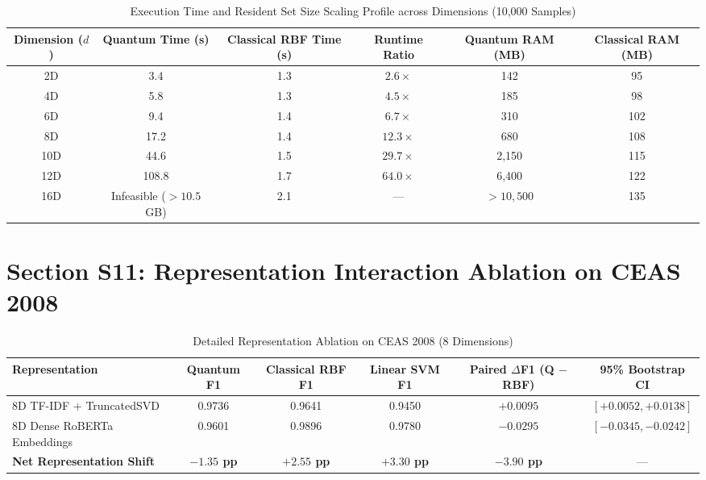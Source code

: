 \documentclass[10pt,letterpaper]{article}
\begin{document}
\begin{table}[h!]
\centering
\small
\caption{Execution Time and Resident Set Size Scaling Profile across Dimensions (10,000 Samples)}
\label{tab:supp_runtime_table}
\begin{tabular}{cccccc}
\toprule
\textbf{Dimension ($d$)} & \textbf{Quantum Time (s)} & \textbf{Classical RBF Time (s)} & \textbf{Runtime Ratio} & \textbf{Quantum RAM (MB)} & \textbf{Classical RAM (MB)} \\
\midrule
2D & 3.4 & 1.3 & $2.6\times$ & 142 & 95 \\
4D & 5.8 & 1.3 & $4.5\times$ & 185 & 98 \\
6D & 9.4 & 1.4 & $6.7\times$ & 310 & 102 \\
8D & 17.2 & 1.4 & $12.3\times$ & 680 & 108 \\
10D & 44.6 & 1.5 & $29.7\times$ & 2,150 & 115 \\
12D & 108.8 & 1.7 & $64.0\times$ & 6,400 & 122 \\
16D & Infeasible ($>10.5$ GB) & 2.1 & — & $>10,500$ & 135 \\
\bottomrule
\end{tabular}
\end{table}

\section{Section S11: Representation Interaction Ablation on CEAS 2008}
\label{sec:supp_ceas}

\begin{table}[h!]
\centering
\small
\caption{Detailed Representation Ablation on CEAS 2008 (8 Dimensions)}
\label{tab:supp_ceas_ablation_table}
\begin{tabular}{lccccc}
\toprule
\textbf{Representation} & \textbf{Quantum F1} & \textbf{Classical RBF F1} & \textbf{Linear SVM F1} & \textbf{Paired $\Delta$F1 (Q $-$ RBF)} & \textbf{95\% Bootstrap CI} \\
\midrule
8D TF-IDF + TruncatedSVD & 0.9736 & 0.9641 & 0.9450 & $+0.0095$ & $[+0.0052, +0.0138]$ \\
8D Dense RoBERTa Embeddings & 0.9601 & 0.9896 & 0.9780 & $-0.0295$ & $[-0.0345, -0.0242]$ \\
\midrule
\textbf{Net Representation Shift} & \textbf{$-1.35$ pp} & \textbf{$+2.55$ pp} & \textbf{$+3.30$ pp} & \textbf{$-3.90$ pp} & — \\
\bottomrule
\end{tabular}
\end{table}
\end{document}

